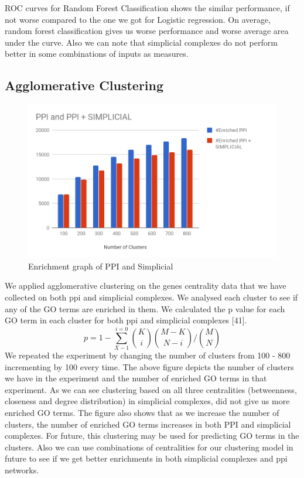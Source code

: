 \documentclass[9pt]{article}
\begin{document}
ROC curves for Random Forest Classification shows the similar performance, if not worse compared to the one we got for Logistic regression. On average, random forest classification gives us worse performance and worse average area under the curve. Also we can note that simplicial complexes do not perform better in some combinations of inputs as measures.

\subsection{Agglomerative Clustering}
\begin{figure}[!htb]
  \centering
  \includegraphics[width=\linewidth]{logisticRegressionGraphs/cluster.png}
\endminipage
\caption{Enrichment graph of PPI and Simplicial}
\end{figure}
We applied agglomerative clustering on the genes centrality data that we have collected on both ppi and simplicial complexes. We analysed each cluster to see if any of the GO terms are enriched in them. We calculated the p value for each GO term in each cluster for both ppi and simplicial complexes [41].
\begin{equation}
p = 1 - \sum_{X-1}^{i=0}\binom{K}{i}\binom{M-K}{N-i}\bigg/\binom{M}{N}
\end{equation}
We repeated the experiment by changing the number of clusters from 100 - 800 incrementing by 100 every time. The above figure depicts the number of clusters we have in the experiment and the number of enriched GO terms in that experiment. As we can see clustering based on all three centralities (betweenness, closeness and degree distribution) in simplicial complexes, did not give us more enriched GO terms. The figure also shows that as we increase the number of clusters, the number of enriched GO terms increases in both PPI and simplicial complexes. For future, this clustering may be used for predicting GO terms in the clusters. Also we can use combinations of centralities for our clustering model in future to see if we get better enrichments in both simplicial complexes and ppi networks. 
\end{document}
